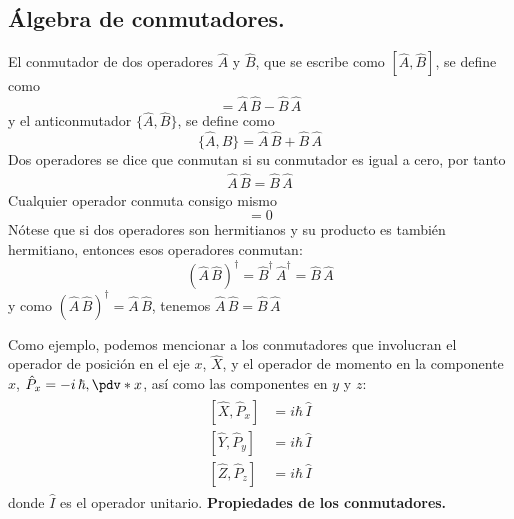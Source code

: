 \subsection{Álgebra de conmutadores.}
El conmutador de dos operadores $\hat{A}$  y $\hat{B}$, que se escribe como $[\hat{A}, \hat{B}]$, se define como
\begin{equation}
[\hat{A}, \hat{B}] = \hat{A} \, \hat{B} - \hat{B} \, \hat{A}
\label{eq:ecuacion_02_79}
\end{equation}
y el anticonmutador $\{ \hat{A}, \hat{B} \}$, se define como
\begin{equation}
\{ \hat{A}, \hat{B} \} = \hat{A} \, \hat{B} + \hat{B} \, \hat{A}
\label{eq:ecuacion_02_80}
\end{equation}
Dos operadores se dice que conmutan si su conmutador es igual a cero, por tanto
\begin{align*}
\hat{A} \, \hat{B} = \hat{B} \, \hat{A}
\end{align*}
Cualquier operador conmuta consigo mismo
\begin{equation}
[\hat{A}, \hat{A}] = 0
\label{eq:ecuacion_02_81}
\end{equation}
Nótese que si dos operadores son hermitianos y su producto es también hermitiano, entonces esos operadores conmutan:
\begin{equation}
(\hat{A} \, \hat{B})^{\dagger} = \hat{B}^{\dagger} \, \hat{A}^{\dagger} = \hat{B} \, \hat{A}
\label{eq:ecuacion_02_82}
\end{equation}
y como $(\hat{A} \, \hat{B})^{\dagger} = \hat{A} \, \hat{B}$, tenemos $\hat{A} \, \hat{B} = \hat{B} \, \hat{A}$
\par
Como ejemplo, podemos mencionar a los conmutadores que involucran el operador de posición en el eje $x$, $\hat{X}$, y el operador de momento en la componente $x$, $\hat{P}_{x} = - i \, \hbar, \pdv*{x}$, así como las componentes en $y$ y $z$:
\begin{align}
\begin{aligned}
[\hat{X}, \hat{P}_{x}] &= i \hbar \, \hat{I} \\
[\hat{Y}, \hat{P}_{y}] &= i \hbar \, \hat{I} \\
[\hat{Z}, \hat{P}_{z}] &= i \hbar \, \hat{I}
\end{aligned}
\label{eq:ecuacion_02_83}
\end{align}
donde $\hat{I}$ es el operador unitario.
\textbf{Propiedades de los conmutadores.}

